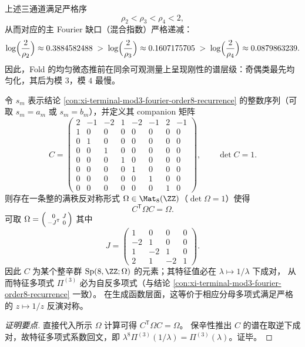 \begin{conclusion}\label{con:xi-terminal-congruence-mixing-hierarchy}
上述三通道满足严格序
\[
\rho_2<\rho_3<\rho_4<2,
\]
从而对应的主 Fourier 缺口（混合指数）严格递减：
\[
\log\Bigl(\frac{2}{\rho_2}\Bigr)\approx 0.3884582488\;>\;
\log\Bigl(\frac{2}{\rho_3}\Bigr)\approx 0.1607175705\;>\;
\log\Bigl(\frac{2}{\rho_4}\Bigr)\approx 0.0879863239.
\]
因此，Fold 的均匀微态推前在同余可观测量上呈现刚性的谱层级：奇偶类最先均匀化，其后为模 \(3\)，模 \(4\) 最慢。
\end{conclusion}

\begin{conclusion}\label{con:xi-terminal-mod3-integral-symplectic}
令 \(s_m\) 表示结论 \ref{con:xi-terminal-mod3-fourier-order8-recurrence} 的整数序列（可取 \(s_m=a_m\) 或 \(s_m=b_m\)），并定义其 companion 矩阵
\[
C=
\begin{pmatrix}
2&-1&-2&1&-2&-1&2&-1\\
1&0&0&0&0&0&0&0\\
0&1&0&0&0&0&0&0\\
0&0&1&0&0&0&0&0\\
0&0&0&1&0&0&0&0\\
0&0&0&0&1&0&0&0\\
0&0&0&0&0&1&0&0\\
0&0&0&0&0&0&1&0
\end{pmatrix},
\qquad \det C=1.
\]
则存在一条整的满秩反对称形式 \(\Omega\in \Mat_{8}(\ZZ)\)（\(\det\Omega=1\)）使得
\[
C^{\mathsf T}\Omega C=\Omega.
\]
可取
\(
\Omega=\begin{psmallmatrix}0&J\\ -J^{\mathsf T}&0\end{psmallmatrix}
\)
其中
\[
J=
\begin{pmatrix}
1&0&0&0\\
-2&1&0&0\\
1&-2&1&0\\
2&1&-2&1
\end{pmatrix}.
\]
因此 \(C\) 为某个整辛群 \(\mathrm{Sp}(8,\ZZ;\Omega)\) 的元素；其特征值必在 \(\lambda\mapsto 1/\lambda\) 下成对，
从而特征多项式 \(\Pi^{(3)}\) 必为自反多项式（与结论 \ref{con:xi-terminal-mod3-fourier-order8-recurrence} 一致）。
在生成函数层面，这等价于相应分母多项式满足严格的 \(z\mapsto 1/z\) 反演对称。
\end{conclusion}
\begin{proof}[证明要点]
直接代入所示 \(\Omega\) 计算可得 \(C^{\mathsf T}\Omega C=\Omega\)。
保辛性推出 \(C\) 的谱在取逆下成对，故特征多项式系数回文，即 \(\lambda^8\Pi^{(3)}(1/\lambda)=\Pi^{(3)}(\lambda)\)。证毕。
\end{proof}


